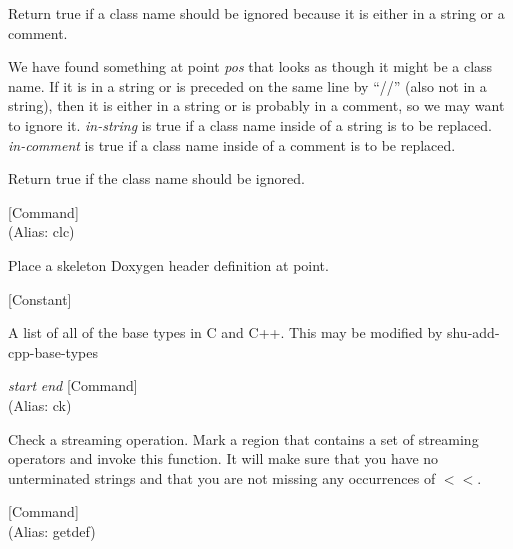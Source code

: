 \begin{doc-string}
Return true if a class name should be ignored because it is either in a
string or a comment.

We have found something at point \emph{pos} that looks as though it might be a class
name.  If it is in a string or is preceded on the same line by ``//'' (also not
in a string), then it is either in a string or is probably in a comment, so we
may want to ignore it.  \emph{in-string} is true if a class name inside of a string is
to be replaced.  \emph{in-comment} is true if a class name inside of a comment is to be
replaced.

Return true if the class name should be ignored.
\end{doc-string}

\vspace{1em}
\noindent
{}
\usebox{\funcname}
 \hfill [Command]\\%
 (Alias: clc)

\begin{doc-string}
Place a skeleton Doxygen header definition at point.
\end{doc-string}

\vspace{1em}
\noindent
{}
\usebox{\funcname}
 \hfill [Constant]

\begin{doc-string}
A list of all of the base types in C and C++.  This may be modified by shu-add-cpp-base-types
\end{doc-string}

\vspace{1em}
\noindent
{}
\usebox{\funcname}\emph{start} \emph{end}
 \hfill [Command]\\%
 (Alias: ck)

\begin{doc-string}
Check a streaming operation.   Mark a region that contains a set of streaming
operators and invoke this function.  It will make sure that you have no unterminated
strings and that you are not missing any occurrences of $<$$<$.
\end{doc-string}

\vspace{1em}
\noindent
{}
\usebox{\funcname}
 \hfill [Command]\\%
 (Alias: getdef)

